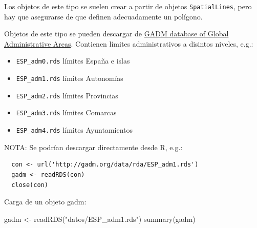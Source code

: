 \documentclass[
  spanish,
]{book}
\newenvironment{Shaded}{\begin{snugshade}}{\end{snugshade}}
\newcommand{\FunctionTok}[1]{\textcolor[rgb]{0.00,0.00,0.00}{#1}}
\newcommand{\NormalTok}[1]{#1}
\newcommand{\OtherTok}[1]{\textcolor[rgb]{0.56,0.35,0.01}{#1}}
\newcommand{\StringTok}[1]{\textcolor[rgb]{0.31,0.60,0.02}{#1}}
\theoremstyle{break}
\begin{document}
Los objetos de este tipo se suelen crear a partir de objetos \texttt{SpatialLines},
pero hay que asegurarse de que definen adecuadamente un polígono.

Objetos de este tipo se pueden descargar de
\href{http://www.gadm.org}{GADM database of Global Administrative Areas}.
Contienen límites administrativos a disintos niveles, e.g.:

\begin{itemize}
\item
  \texttt{ESP\_adm0.rds} límites España e islas
\item
  \texttt{ESP\_adm1.rds} límites Autonomías
\item
  \texttt{ESP\_adm2.rds} límites Provincias
\item
  \texttt{ESP\_adm3.rds} límites Comarcas
\item
  \texttt{ESP\_adm4.rds} límites Ayuntamientos
\end{itemize}

NOTA: Se podrían descargar directamente desde R, e.g.:

\begin{verbatim}
  con <- url('http://gadm.org/data/rda/ESP_adm1.rds')
  gadm <- readRDS(con)
  close(con)
\end{verbatim}

Carga de un objeto gadm:

\begin{Shaded}
\begin{Highlighting}[]
\NormalTok{gadm }\OtherTok{\textless{}{-}} \FunctionTok{readRDS}\NormalTok{(}\StringTok{"datos/ESP\_adm1.rds"}\NormalTok{) }
\FunctionTok{summary}\NormalTok{(gadm)}
\end{Highlighting}
\end{Shaded}
\end{document}
